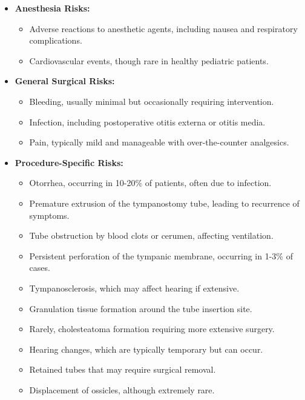 \begin{itemize}
  \item \textbf{Anesthesia Risks:}
    \begin{itemize}
      \item Adverse reactions to anesthetic agents, including nausea and respiratory complications.
      \item Cardiovascular events, though rare in healthy pediatric patients.
    \end{itemize}
  
  \item \textbf{General Surgical Risks:}
    \begin{itemize}
      \item Bleeding, usually minimal but occasionally requiring intervention.
      \item Infection, including postoperative otitis externa or otitis media.
      \item Pain, typically mild and manageable with over-the-counter analgesics.
    \end{itemize}
  
  \item \textbf{Procedure-Specific Risks:}
    \begin{itemize}
      \item Otorrhea, occurring in 10-20\% of patients, often due to infection.
      \item Premature extrusion of the tympanostomy tube, leading to recurrence of symptoms.
      \item Tube obstruction by blood clots or cerumen, affecting ventilation.
      \item Persistent perforation of the tympanic membrane, occurring in 1-3\% of cases.
      \item Tympanosclerosis, which may affect hearing if extensive.
      \item Granulation tissue formation around the tube insertion site.
      \item Rarely, cholesteatoma formation requiring more extensive surgery.
      \item Hearing changes, which are typically temporary but can occur.
      \item Retained tubes that may require surgical removal.
      \item Displacement of ossicles, although extremely rare.
    \end{itemize}
\end{itemize}

